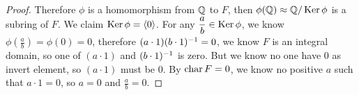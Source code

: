 \documentclass[../main.tex]{subfiles}
\begin{document}
\begin{proof}
  Therefore $\phi$ is a homomorphism from $\mathbb{Q}$ to $F$,
  then $\phi(\mathbb{Q}) \approx \mathbb{Q} / \operatorname{Ker} \phi$ is a subring of $F$.
  We claim $\operatorname{Ker} \phi = \langle 0 \rangle$. For any $\displaystyle \frac{a}{b} \in \operatorname{Ker} \phi$,
  we know $\displaystyle \phi(\frac{a}{b}) = \phi(0) = 0$, 
  therefore $(a \cdot 1)(b \cdot 1)^{-1} = 0$, we know $F$ is an integral domain,
  so one of $(a \cdot 1)$ and $(b \cdot 1)^{-1}$ is zero. 
  But we know no one have $0$ as invert element, so $(a \cdot 1)$ must be $0$.
  By $\operatorname{char} F = 0$, we know no positive $a$ such that $a \cdot 1 = 0$, so $a = 0$
  and $\displaystyle \frac{a}{b} = 0$.
\end{proof}
\end{document}
